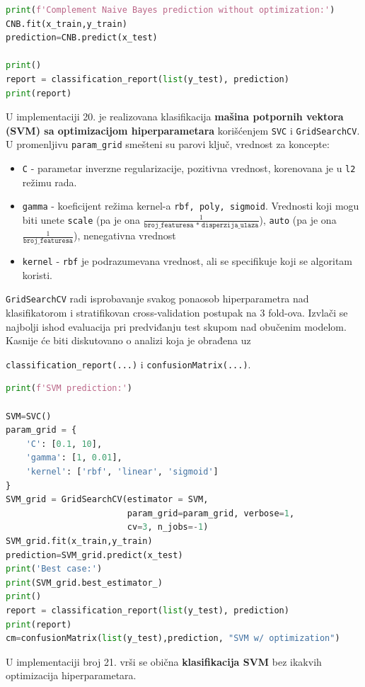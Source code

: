 \documentclass[fontsize=12bp, paper=a4]{scrarticle}
\begin{document}
\begin{lstlisting}[language=Python, caption=Komplement naivni Bajes bez ikakvih optimizacija hiperparametara.]
print(f'Complement Naive Bayes prediction without optimization:')
CNB.fit(x_train,y_train)
prediction=CNB.predict(x_test)

print()
report = classification_report(list(y_test), prediction)
print(report)
\end{lstlisting}
U implementaciji 20. je realizovana klasifikacija \textbf{mašina potpornih vektora (SVM) sa optimizacijom hiperparametara} korišćenjem \verb|SVC|\cite{SVC} i \verb|GridSearchCV|. U promenljivu \verb|param_grid| smešteni su parovi ključ, vrednost za koncepte:
\begin{itemize}
    \item \verb|C| - parametar inverzne regularizacije, pozitivna vrednost, korenovana je u \verb|l2| režimu rada.
    \item \verb|gamma| - koeficijent režima kernel-a \verb|rbf, poly, sigmoid|. Vrednosti koji mogu biti unete \verb|scale| (pa je ona $\frac{1}{\texttt{broj\_featuresa * disperzija\_ulaza}}$), \verb|auto| (pa je ona  $\frac{1}{\texttt{broj\_{featuresa}}}$), nenegativna vrednost
    \item \verb|kernel| -  \verb|rbf| je podrazumevana vrednost, ali se specifikuje koji se algoritam koristi.
\end{itemize} 
\verb*|GridSearchCV| radi isprobavanje svakog ponaosob hiperparametra nad klasifikatorom i stratifikovan cross-validation postupak na 3 fold-ova. Izvlači se najbolji ishod evaluacija pri predviđanju test skupom nad obučenim modelom. Kasnije će biti diskutovano o analizi koja je obrađena uz 

\verb|classification_report(...)| i \verb|confusionMatrix(...)|.
\begin{lstlisting}[language=Python, caption=SVM sa optimizacijama hiperparametara.]
print(f'SVM prediction:')

SVM=SVC()
param_grid = {
    'C': [0.1, 10],
    'gamma': [1, 0.01],
    'kernel': ['rbf', 'linear', 'sigmoid']
}
SVM_grid = GridSearchCV(estimator = SVM,
						param_grid=param_grid, verbose=1, 									
                        cv=3, n_jobs=-1)
SVM_grid.fit(x_train,y_train)
prediction=SVM_grid.predict(x_test)
print('Best case:')
print(SVM_grid.best_estimator_)
print()
report = classification_report(list(y_test), prediction)
print(report)
cm=confusionMatrix(list(y_test),prediction, "SVM w/ optimization")

\end{lstlisting}
U implementaciji broj 21. vrši se obična \textbf{klasifikacija SVM} bez ikakvih optimizacija hiperparametara.
\end{document}

